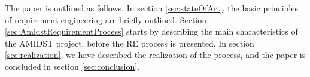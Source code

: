 The paper is outlined as follows. In section  \ref{sec:stateOfArt}, the basic principles of requirement engineering are briefly outlined. Section  \ref{sec:AmidstRequirementProcess} starts by describing the main characteristics of the AMIDST project, before the RE process is presented. In section  \ref{sec:realization}, we have described the realization of the process, and the paper is concluded in section  \ref{sec:conclusion}.
